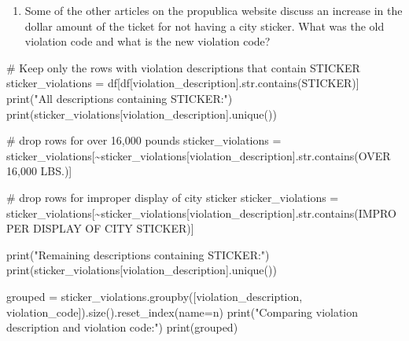 \documentclass[
  letterpaper,
  DIV=11,
  numbers=noendperiod]{scrartcl}
\newenvironment{Shaded}{\begin{snugshade}}{\end{snugshade}}
\newcommand{\BuiltInTok}[1]{\textcolor[rgb]{0.00,0.23,0.31}{#1}}
\newcommand{\CommentTok}[1]{\textcolor[rgb]{0.37,0.37,0.37}{#1}}
\newcommand{\NormalTok}[1]{\textcolor[rgb]{0.00,0.23,0.31}{#1}}
\newcommand{\OperatorTok}[1]{\textcolor[rgb]{0.37,0.37,0.37}{#1}}
\newcommand{\StringTok}[1]{\textcolor[rgb]{0.13,0.47,0.30}{#1}}
\providecommand{\tightlist}{%
  \setlength{\itemsep}{0pt}\setlength{\parskip}{0pt}}\usepackage{longtable,booktabs,array}
\begin{document}
\begin{enumerate}
\def\labelenumi{\arabic{enumi}.}
\setcounter{enumi}{2}
\tightlist
\item
  Some of the other articles on the propublica website discuss an
  increase in the dollar amount of the ticket for not having a city
  sticker. What was the old violation code and what is the new violation
  code?
\end{enumerate}

\begin{Shaded}
\begin{Highlighting}[]
\CommentTok{\# Keep only the rows with violation descriptions that contain \textquotesingle{}STICKER\textquotesingle{}}
\NormalTok{sticker\_violations }\OperatorTok{=}\NormalTok{ df[df[}\StringTok{\textquotesingle{}violation\_description\textquotesingle{}}\NormalTok{].}\BuiltInTok{str}\NormalTok{.contains(}\StringTok{\textquotesingle{}STICKER\textquotesingle{}}\NormalTok{)]}
\BuiltInTok{print}\NormalTok{(}\StringTok{"All descriptions containing \textquotesingle{}STICKER\textquotesingle{}:"}\NormalTok{)}
\BuiltInTok{print}\NormalTok{(sticker\_violations[}\StringTok{\textquotesingle{}violation\_description\textquotesingle{}}\NormalTok{].unique())}

\CommentTok{\# drop rows for over 16,000 pounds}
\NormalTok{sticker\_violations }\OperatorTok{=}\NormalTok{ sticker\_violations[}\OperatorTok{\textasciitilde{}}\NormalTok{sticker\_violations[}\StringTok{\textquotesingle{}violation\_description\textquotesingle{}}\NormalTok{].}\BuiltInTok{str}\NormalTok{.contains(}\StringTok{\textquotesingle{}OVER 16,000 LBS.\textquotesingle{}}\NormalTok{)]}

\CommentTok{\# drop rows for improper display of city sticker}
\NormalTok{sticker\_violations }\OperatorTok{=}\NormalTok{ sticker\_violations[}\OperatorTok{\textasciitilde{}}\NormalTok{sticker\_violations[}\StringTok{\textquotesingle{}violation\_description\textquotesingle{}}\NormalTok{].}\BuiltInTok{str}\NormalTok{.contains(}\StringTok{\textquotesingle{}IMPROPER DISPLAY OF CITY STICKER\textquotesingle{}}\NormalTok{)]}

\BuiltInTok{print}\NormalTok{(}\StringTok{"Remaining descriptions containing \textquotesingle{}STICKER\textquotesingle{}:"}\NormalTok{)}
\BuiltInTok{print}\NormalTok{(sticker\_violations[}\StringTok{\textquotesingle{}violation\_description\textquotesingle{}}\NormalTok{].unique())}

\NormalTok{grouped }\OperatorTok{=}\NormalTok{ sticker\_violations.groupby([}\StringTok{\textquotesingle{}violation\_description\textquotesingle{}}\NormalTok{, }\StringTok{\textquotesingle{}violation\_code\textquotesingle{}}\NormalTok{]).size().reset\_index(name}\OperatorTok{=}\StringTok{\textquotesingle{}n\textquotesingle{}}\NormalTok{)}
\BuiltInTok{print}\NormalTok{(}\StringTok{"Comparing violation description and violation code:"}\NormalTok{)}
\BuiltInTok{print}\NormalTok{(grouped)}


\end{Highlighting}
\end{Shaded}
\end{document}
